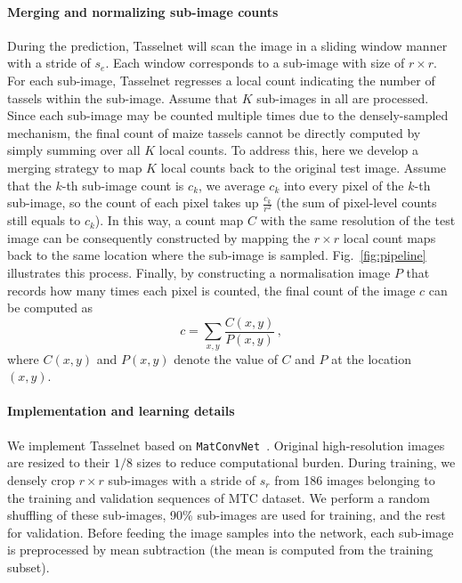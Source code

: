 \documentclass[twocolumn]{bmcart}%
\begin{document}
\paragraph{Merging and normalizing sub-image counts}
During the prediction, Tasselnet will scan the image in a sliding window manner with a stride of $s_e$. Each window corresponds to a sub-image with size of $r\times r$. For each sub-image, Tasselnet regresses a local count indicating the number of tassels within the sub-image. Assume that $K$ sub-images in all are processed. Since each sub-image may be counted multiple times due to the densely-sampled mechanism, the final count of maize tassels cannot be directly computed by simply summing over all $K$ local counts. To address this, here we develop a merging strategy to map $K$ local counts back to the original test image. Assume that the $k$-th sub-image count is $c_k$, we average $c_k$ into every pixel of the $k$-th sub-image, so the count of each pixel takes up $\frac{c_k}{r^2}$ (the sum of pixel-level counts still equals to $c_k$). In this way, a count map $C$ with the same resolution of the test image can be consequently constructed by mapping the $r\times r$ local count maps back to the same location where the sub-image is sampled. Fig.~\ref{fig:pipeline} illustrates this process. Finally, by constructing a normalisation image $P$ that records how many times each pixel is counted, the final count of the image $c$ can be computed as
\begin{equation}\label{eq:count}
c=\sum_{x,y}\frac{C(x,y)}{P(x,y)}\,,
\end{equation}
where $C(x,y)$ and $P(x,y)$ denote the value of $C$ and $P$ at the location $(x,y)$.

\paragraph{Implementation and learning details}
We implement Tasselnet based on \texttt{MatConvNet}~\cite{Vedaldi2015conv}. Original high-resolution images are resized to their $1/8$ sizes to reduce computational burden. During training, we densely crop $r\times r$ sub-images with a stride of $s_r$ from 186 images belonging to the training and validation sequences of MTC dataset. We perform a random shuffling of these sub-images, 90\% sub-images are used for training, and the rest for validation. Before feeding the image samples into the network, each sub-image is preprocessed by mean subtraction (the mean is computed from the training subset).
\end{document}
